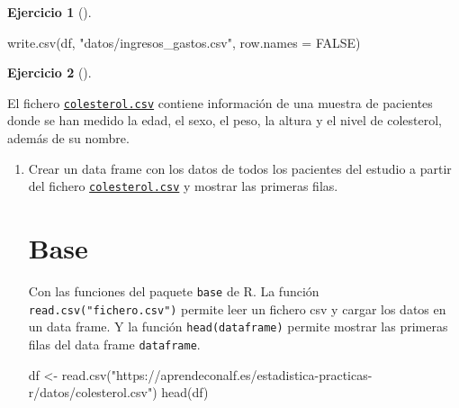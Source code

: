 \documentclass[
  spanish,
  a4paper,
]{scrreport}
\newenvironment{Shaded}{\begin{snugshade}}{\end{snugshade}}
\newcommand{\AttributeTok}[1]{\textcolor[rgb]{0.40,0.45,0.13}{#1}}
\newcommand{\ConstantTok}[1]{\textcolor[rgb]{0.56,0.35,0.01}{#1}}
\newcommand{\FunctionTok}[1]{\textcolor[rgb]{0.28,0.35,0.67}{#1}}
\newcommand{\NormalTok}[1]{\textcolor[rgb]{0.00,0.23,0.31}{#1}}
\newcommand{\OtherTok}[1]{\textcolor[rgb]{0.00,0.23,0.31}{#1}}
\newcommand{\StringTok}[1]{\textcolor[rgb]{0.13,0.47,0.30}{#1}}
\theoremstyle{definition}
\newtheorem{exercise}{Ejercicio}[chapter]
\theoremstyle{remark}
\begin{document}
\begin{exercise}[]
\begin{enumerate}
\begin{tcolorbox}
\begin{Shaded}
\begin{Highlighting}[]
\FunctionTok{write.csv}\NormalTok{(df, }\StringTok{"datos/ingresos\_gastos.csv"}\NormalTok{, }\AttributeTok{row.names =} \ConstantTok{FALSE}\NormalTok{)}
\end{Highlighting}
\end{Shaded}

  \end{tcolorbox}
\end{enumerate}

\end{exercise}

\begin{exercise}[]\protect\hypertarget{exr-dataframes-2}{}\label{exr-dataframes-2}

El fichero \href{datos/colesterol.csv}{\texttt{colesterol.csv}} contiene
información de una muestra de pacientes donde se han medido la edad, el
sexo, el peso, la altura y el nivel de colesterol, además de su nombre.

\begin{enumerate}
\def\labelenumi{\alph{enumi}.}
\item
  Crear un data frame con los datos de todos los pacientes del estudio a
  partir del fichero
  \href{datos/colesterol.csv}{\texttt{colesterol.csv}} y mostrar las
  primeras filas.

  \begin{tcolorbox}[enhanced jigsaw, breakable, leftrule=.75mm, toptitle=1mm, rightrule=.15mm, opacitybacktitle=0.6, left=2mm, colframe=quarto-callout-tip-color-frame, titlerule=0mm, toprule=.15mm, opacityback=0, bottomtitle=1mm, coltitle=black, colbacktitle=quarto-callout-tip-color!10!white, title=\textcolor{quarto-callout-tip-color}{\faLightbulb}\hspace{0.5em}{Solución}, arc=.35mm, bottomrule=.15mm, colback=white]

  \section{Base}

  Con las funciones del paquete \texttt{base} de R. La función
  \texttt{read.csv("fichero.csv")} permite leer un fichero csv y cargar
  los datos en un data frame. Y la función \texttt{head(dataframe)}
  permite mostrar las primeras filas del data frame \texttt{dataframe}.

\begin{Shaded}
\begin{Highlighting}[]
\NormalTok{df }\OtherTok{\textless{}{-}} \FunctionTok{read.csv}\NormalTok{(}\StringTok{"https://aprendeconalf.es/estadistica{-}practicas{-}r/datos/colesterol.csv"}\NormalTok{)}
\FunctionTok{head}\NormalTok{(df)}
\end{Highlighting}
\end{Shaded}


\end{tcolorbox}
\end{enumerate}
\end{exercise}
\end{document}
